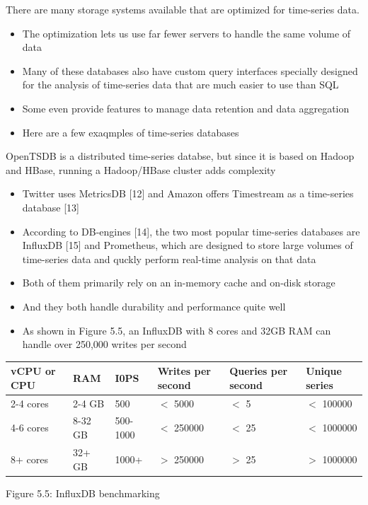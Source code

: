 \documentclass{report}
\theoremstyle{definition}
\begin{document}
There are many storage systems available that are optimized for time-series data.

\begin{itemize}
\item
The optimization lets us use far fewer servers to handle the same volume of data
\item
Many of these databases also have custom query interfaces specially designed for the analysis of time-series data that are much easier to use than SQL
\item
Some even provide features to manage data retention and data aggregation
\item
Here are a few exaqmples of time-series databases
\end{itemize}

OpenTSDB is a distributed time-series databse, but since it is based on Hadoop and HBase, running a Hadoop/HBase cluster adds complexity

\begin{itemize}
\item
Twitter uses MetricsDB [12] and Amazon offers Timestream as a time-series database [13]
\item
According to DB-engines [14], the two most popular time-series databases are InfluxDB [15] and Prometheus, which are designed to store large volumes of time-series data and quckly perform real-time analysis on that data
\item
Both of them primarily rely on an in-memory cache and on-disk storage
\item
And they both handle durability and performance quite well
\item
As shown in Figure 5.5, an InfluxDB with 8 cores and 32GB RAM can handle over 250,000 writes per second
\end{itemize}

\begin{tabular}{|p{1.5cm}|p{1.5cm}|p{1.5cm}|p{1.5cm}|p{1.5cm}|p{1.5cm}|}
\hline
vCPU or CPU & RAM & I0PS & Writes per second & Queries per second & Unique series \\
\hline
2-4 cores & 2-4 GB  & 500 & $<$ 5000 & $<$ 5 & $<$ 100000\\
\hline
4-6 cores & 8-32 GB  & 500-1000 & $<$ 250000 & $<$ 25 & $<$ 1000000\\
\hline
8+ cores & 32+ GB  & 1000+ & $>$ 250000 & $>$ 25 & $>$ 1000000\\
\hline
\end{tabular}

Figure 5.5: InfluxDB benchmarking
\end{document}
